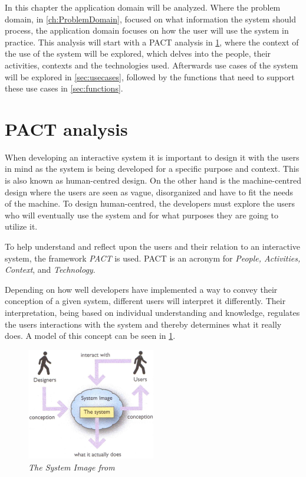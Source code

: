 In this chapter the application domain will be analyzed.
Where the problem domain, in \cref{ch:ProblemDomain}, focused on what information the system should process, the application domain focuses on how the user will use the system in practice.
This analysis will start with a PACT \cite{Benyon} analysis in \cref{sec:PACT}, where the context of the use of the system will be explored, which delves into the people, their activities, contexts and the technologies used.
Afterwards use cases of the system will be explored in \cref{sec:usecases}, followed by the functions that need to support these use cases in \cref{sec:functions}.

\section{PACT analysis}\label{sec:PACT}
When developing an interactive system it is important to design it with the users in mind as the system is being developed for a specific purpose and context.
This is also known as human-centred design.
On the other hand is the machine-centred design where the users are seen as vague, disorganized and have to fit the needs of the machine.
To design human-centred, the developers must explore the users who will eventually use the system and for what purposes they are going to utilize it.

To help understand and reflect upon the users and their relation to an interactive system, the framework \textit{PACT} \cite{Benyon} is used.
PACT is an acronym for \textit{People, Activities, Context}, and \textit{Technology}.

Depending on how well developers have implemented a way to convey their conception of a given system, different users will interpret it differently.
Their interpretation, being based on individual understanding and knowledge, regulates the users interactions with the system and thereby determines what it really does.
A model of this concept can be seen in \cref{fig:PACT-SystemImage}.

\begin{figure}[H]
	\centering
	\includegraphics[width=0.5\textwidth]{billeder/SystemImage-Benyon.jpg}
	\caption{\textit{The System Image from \citep[p.~31]{Benyon}}}
	\label{fig:PACT-SystemImage}
\end{figure}

